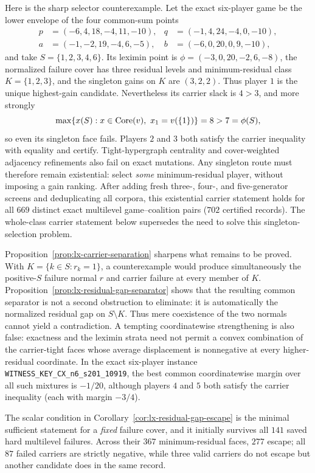Here is the sharp selector counterexample.  Let the exact six-player game be
the lower envelope of the four common-sum points
\[
\begin{aligned}
 p&=(-6,4,18,-4,11,-10),&q&=(-1,4,24,-4,0,-10),\\
 a&=(-1,-2,19,-4,6,-5),&b&=(-6,0,20,0,9,-10),
\end{aligned}
\]
and take $S=\{1,2,3,4,6\}$.  Its leximin point is
$\phi=(-3,0,20,-2,6,-8)$, the normalized failure cover has three residual
levels and minimum-residual class $K=\{1,2,3\}$, and the singleton gains on
$K$ are $(3,2,2)$.  Thus player $1$ is the unique highest-gain candidate.
Nevertheless its carrier slack is $4>3$, and more strongly
\[
 \max\{x(S):x\in\core(v),\ x_1=v(\{1\})\}=8>7=\phi(S),
\]
so even its singleton face fails.  Players $2$ and $3$ both satisfy the
carrier inequality with equality and certify.  Tight-hypergraph centrality
and cover-weighted adjacency refinements also fail on exact mutations.  Any
singleton route must therefore remain existential: select \emph{some}
minimum-residual player, without imposing a gain ranking.  After adding fresh
three-, four-, and five-generator screens and deduplicating all corpora, this
existential carrier statement holds for all $669$ distinct exact multilevel
game--coalition pairs ($702$ certified records).  The whole-class carrier
statement below supersedes the need to solve this singleton-selection problem.

Proposition~\ref{prop:lx-carrier-separation} sharpens what remains to be
proved.  With $K=\{k\in S:r_k=1\}$, a counterexample would produce
simultaneously the positive-$S$ failure normal $r$ and carrier failure at
every member of $K$.  Proposition~\ref{prop:lx-residual-gap-separator} shows
that the resulting common separator is not a second obstruction to eliminate:
it is automatically the normalized residual gap on $S\setminus K$.  Thus
mere coexistence of the two normals cannot yield a contradiction.  A tempting
coordinatewise strengthening is also false: exactness and the leximin strata
need not permit a convex combination of the carrier-tight faces whose average
displacement is nonnegative at every higher-residual coordinate.  In the exact
six-player instance \texttt{WITNESS\_KEY\_CX\_n6\_s201\_10919}, the best common
coordinatewise margin over all such mixtures is $-1/20$, although players $4$
and $5$ both satisfy the carrier inequality (each with margin $-3/4$).

The scalar condition in Corollary~\ref{cor:lx-residual-gap-escape} is the
minimal sufficient statement for a \emph{fixed} failure cover, and it initially
survives all $141$ saved hard multilevel failures.  Across their $367$
minimum-residual faces, $277$ escape; all $87$ failed carriers are strictly
negative, while three valid carriers do not escape but another candidate does
in the same record.

